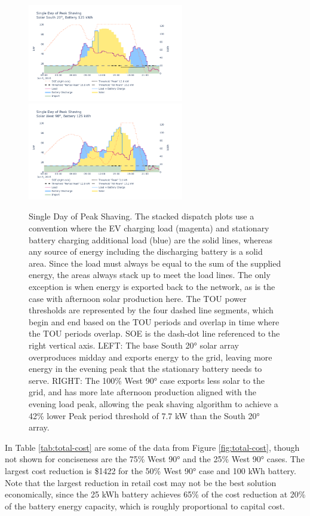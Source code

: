 \documentclass[journal,article,submit,pdftex,moreauthors]{Definitions/mdpi}
\begin{document}
\begin{figure}[!h]
  \centering
  \includegraphics[width=6.8cm]{./images/single day of peak shaving south.png}
  \includegraphics[width=6.8cm]{./images/single day of peak shaving west.png}
  \caption{Single Day of Peak Shaving. The stacked dispatch plots use a convention where the EV charging load (magenta) and stationary battery charging additional load (blue) are the solid lines, whereas any source of energy including the discharging battery is a solid area. Since the load must always be equal to the sum of the supplied energy, the areas always stack up to meet the load lines. The only exception is when energy is exported back to the network, as is the case with afternoon solar production here. The TOU power thresholds are represented by the four dashed line segments, which begin and end based on the TOU periods and overlap in time where the TOU periods overlap. SOE is the dash-dot line referenced to the right vertical axis. LEFT: The base South 20° solar array overproduces midday and exports energy to the grid, leaving more energy in the evening peak that the stationary battery needs to serve. RIGHT: The 100\% West 90° case exports less solar to the grid, and has more late afternoon production aligned with the evening load peak, allowing the peak shaving algorithm to achieve a 42\% lower Peak period threshold of 7.7 kW than the South 20° array.}
  \label{fig:peak-shaving}
\end{figure}



In Table \ref{tab:total-cost} are some of the data from Figure \ref{fig:total-cost}, though not shown for conciseness are the 75\% West 90° and the 25\% West 90° cases. The largest cost reduction is \$1422 for the 50\% West 90° case and 100 kWh battery. Note that the largest reduction in retail cost may not be the best solution economically, since the 25 kWh battery achieves 65\% of the cost reduction at 20\% of the battery energy capacity, which is roughly proportional to capital cost.
\end{document}
